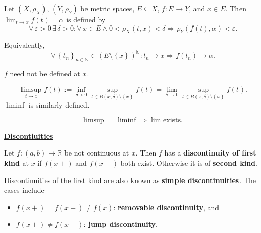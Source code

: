 \documentclass{notes}
\begin{document}
  \begin{defn}
    Let $(X, \rho_X)$, $(Y, \rho_Y)$ be metric spaces, $E \subseteq X$, $f \colon E \to Y$, and $x \in \overline E$.
    Then $\lim_{t \to x} f(t) = \alpha$ is defined by 
    \[
      \forall \, \varepsilon > 0 \, \exists \, \delta > 0: \forall \, x \in E \land 0 < \rho_X(t, x) < \delta \Rightarrow \rho_Y(f(t), \alpha) < \varepsilon.
    \]
    
    Equivalently, 
    \[ 
      \forall \, \left \{ t_n \right \}_{n \in \mathbb N} \in (E \setminus \left \{ x \right \})^\mathbb N: t_n \to x \Rightarrow f(t_n) \to \alpha.
    \]

    \begin{note}
      $f$ need not be defined at $x$.
    \end{note}
  \end{defn}
  
  \begin{rmk}
    \[
      \limsup_{t \to x} f(t) := \inf_{\delta > 0} \sup_{t \in B(x, \delta) \setminus \left \{ x \right \}} f(t) = \lim_{\delta \to 0} \sup_{t \in B(x, \delta) \setminus \left \{ x \right \}} f(t).
    \]
    $\liminf$ is similarly defined.
  \end{rmk}
  
  \begin{rmk}
    \[
      \limsup = \liminf \Rightarrow \text{$\lim$ exists.}
    \]
  \end{rmk}
  
  \underline{{\boldmath \bfseries Discontiuities}}
  
  \begin{defn}
    Let $f \colon (a, b) \to \mathbb R$ be not continuous at $x$. Then $f$ has a {\boldmath \bfseries discontinuity of first kind} at $x$ if $f(x+)$ and $f(x-)$ both exist.
    Otherwise it is of {\boldmath \bfseries second kind}.
  \end{defn}
  
  \begin{rmk}
    Discontinuities of the first kind are also known as {\boldmath \bfseries simple discontinuities}.
    The cases include 
    \begin{itemize}
      \item $f(x+) = f(x-) \neq f(x)$: {\boldmath \bfseries removable discontinuity}, and  

      \item $f(x+) \neq f(x-)$: {\boldmath \bfseries jump discontinuity}.
    \end{itemize}
  \end{rmk}
  
\end{document}
